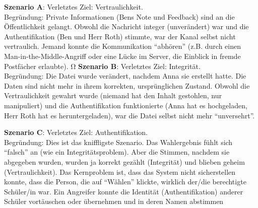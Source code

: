 \begin{myexercise}
    \begin{myanswer}
        \textbf{Szenario A}: Verletztes Ziel: Vertraulichkeit.\\
        Begründung: Private Informationen (Bens Note und Feedback) sind an die Öffentlichkeit gelangt. Obwohl die
        Nachricht integer (unverändert) war und die Authentifikation (Ben und Herr Roth) stimmte, war der Kanal
        selbst nicht vertraulich. Jemand konnte die Kommunikation ``abhören'' (z.B. durch einen
        Man-in-the-Middle-Angriff oder eine Lücke im Server, die Einblick in fremde Postfächer erlaubte).
Ω
        \textbf{Szenario B}: Verletztes Ziel: Integrität.\\
        Begründung: Die Datei wurde verändert, nachdem Anna sie erstellt hatte. Die Daten sind nicht mehr in ihrem
        korrekten, ursprünglichen Zustand. Obwohl die Vertraulichkeit gewahrt wurde (niemand hat den Inhalt
        gestohlen, nur manipuliert) und die Authentifikation funktionierte (Anna hat es hochgeladen, Herr Roth hat
        es heruntergeladen), war die Datei selbst nicht mehr ``unversehrt''.

        \textbf{Szenario C}: Verletztes Ziel: Authentifikation.\\
        Begründung: Dies ist das kniffligste Szenario. Das Wahlergebnis fühlt sich ``falsch'' an (wie ein
        Integritätsproblem). Aber die Stimmen, nachdem sie abgegeben wurden, wurden ja korrekt gezählt (Integrität)
        und blieben geheim (Vertraulichkeit). Das Kernproblem ist, dass das System nicht sicherstellen konnte, dass
        die Person, die auf ``Wählen'' klickte, wirklich der/die berechtigte Schüler/in war. Ein Angreifer konnte die
        Identität (Authentifikation) anderer Schüler vortäuschen oder übernehmen und in deren Namen abstimmen
    \end{myanswer}
\end{myexercise}